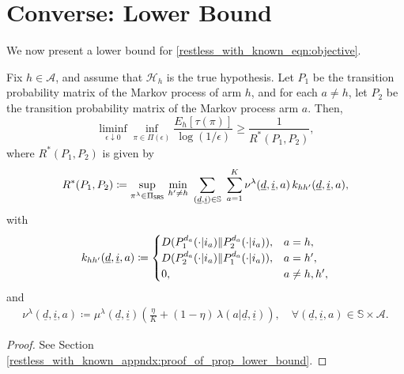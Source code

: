 \section{Converse: Lower Bound}\label{restless_with_known_sec:lower_bound}
We now present a lower bound for \eqref{restless_with_known_eqn:objective}.
\begin{prop}
    \label{restless_with_known_prop:lower_bound}
	Fix $h\in\mathcal{A}$, and assume that $\mathcal{H}_h$ is the true hypothesis. Let $P_1$ be the transition probability matrix of the Markov process of arm $h$, and for each $a\neq h$, let $P_2$ be the transition probability matrix of the Markov process arm $a$. Then,
\begin{equation}
	\liminf\limits_{\epsilon\downarrow 0}\inf\limits_{\pi\in\Pi(\epsilon)}\frac{E_h[\tau(\pi)]}{\log(1/\epsilon)}\geq \frac{1}{R^*(P_1,P_2)},\label{restless_with_known_eq:lower_bound}
\end{equation}
where $R^*(P_1,P_2)$ is given by
\begingroup \allowdisplaybreaks\begin{align}
R^*(P_1,P_2)
\coloneqq \sup\limits_{\pi^\lambda\in\Pi_{\textsf{SRS}}}\, \min\limits_{h'\neq h} ~ \sum\limits_{(\underline{d},\underline{i})\in\mathbb{S}}~\sum\limits_{a=1}^{K}  \nu^\lambda(\underline{d},\underline{i},a) \,\textcolor{black}{k_{hh'}(\underline{d}, \underline{i}, a)},\label{restless_with_known_eq:R_delta^*(h,P_1,P_2)}
\end{align}\endgroup
with
\begin{equation}
	\textcolor{black}{k_{hh'}(\underline{d}, \underline{i}, a)}\coloneqq
	\begin{cases}
		D(P_1^{d_a}(\cdot|i_a)\|P_2^{d_a}(\cdot|i_a)),&a=h,\\
		{D(P_2^{d_a}(\cdot|i_a)\|P_1^{d_a}(\cdot|i_a))},&a=h',\\
		0,& a\neq h,h',
	\end{cases}\label{restless_with_known_eq:k(a,d_a,i_a)}
\end{equation}
and
\begin{eqnarray}
 \nu^\lambda(\underline{d},\underline{i},a)\coloneqq \mu^\lambda(\underline{d},\underline{i})\left(\frac{\eta}{K}+(1-\eta)\,\lambda(a|\underline{d},\underline{i})\right), \quad
\forall (\underline{d},\underline{i},a)\in\mathbb{S}\times\mathcal{A}.
\label{restless_with_known_eq:ergodic_state_action_occupancy_measure}
\end{eqnarray}
\end{prop}
\begin{proof}
See Section \ref{restless_with_known_appndx:proof_of_prop_lower_bound}.
\end{proof}
